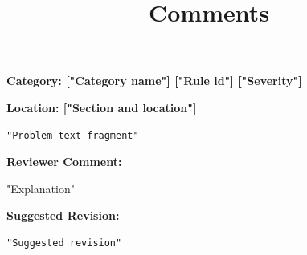 \documentclass[12pt]{article}
\title{Comments}
\begin{document}
	\maketitle
	
	
	\begin{reviewer}
\noindent \textbf{Category: ["Category name"] ["Rule id"] ["Severity"]}

\noindent \textbf{Location: ["Section and location"]}

\begin{lstlisting}[breaklines=true]
	"Problem text fragment"
\end{lstlisting}

\textbf{Reviewer Comment:} 

"Explanation"

\textbf{Suggested Revision:}

\begin{lstlisting}[breaklines=true]
	"Suggested revision"
\end{lstlisting}
	\end{reviewer}
\end{document}
